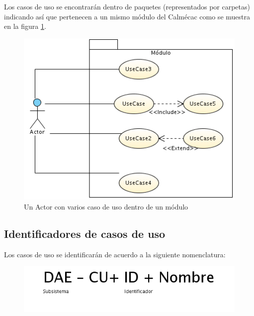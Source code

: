Los casos de uso se encontrarán dentro de paquetes (representados por carpetas) indicando así que pertenecen a un mismo módulo del Calmécac como se muestra en la figura \ref{fig:pack}.

\begin{figure}[hbtp!]
	\begin{center}
		\includegraphics[width=.4\textwidth]{introduccion/images/Paquete}
	\end{center}
	\label{fig:pack}
	\caption{Un Actor con varios caso de uso dentro de un módulo}
\end{figure}

\pagebreak



\subsection{Identificadores de casos de uso}

Los casos de uso se identificarán de acuerdo a la siguiente nomenclatura:

\begin{figure}[hbtp!]
	\begin{center}
		\includegraphics[width=.7\textwidth]{introduccion/images/UCnombre}
	\end{center}
	\label{fig:nomenclatura}
\end{figure}


